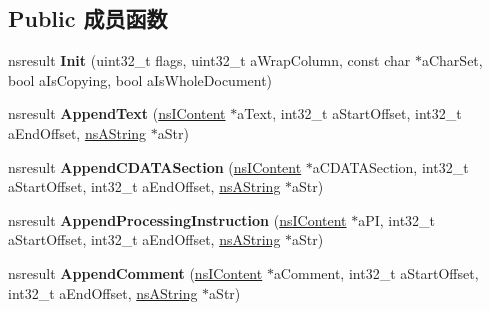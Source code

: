 \subsection*{Public 成员函数}
\begin{DoxyCompactItemize}
\item 
\mbox{\label{interfacens_i_content_serializer_a5e286e64920b179e0323b27c1aa722df}} 
nsresult {\bfseries Init} (uint32\+\_\+t flags, uint32\+\_\+t a\+Wrap\+Column, const char $\ast$a\+Char\+Set, bool a\+Is\+Copying, bool a\+Is\+Whole\+Document)
\item 
\mbox{\label{interfacens_i_content_serializer_a3f5c0d87ba91fc7f913ef51097fd716e}} 
nsresult {\bfseries Append\+Text} (\hyperlink{interfacens_i_content}{ns\+I\+Content} $\ast$a\+Text, int32\+\_\+t a\+Start\+Offset, int32\+\_\+t a\+End\+Offset, \hyperlink{structns_string_container}{ns\+A\+String} $\ast$a\+Str)
\item 
\mbox{\label{interfacens_i_content_serializer_a5493ced158faebbd97b8686a9c22a5ab}} 
nsresult {\bfseries Append\+C\+D\+A\+T\+A\+Section} (\hyperlink{interfacens_i_content}{ns\+I\+Content} $\ast$a\+C\+D\+A\+T\+A\+Section, int32\+\_\+t a\+Start\+Offset, int32\+\_\+t a\+End\+Offset, \hyperlink{structns_string_container}{ns\+A\+String} $\ast$a\+Str)
\item 
\mbox{\label{interfacens_i_content_serializer_a5ea38dc89d536f56f05a404d914a6595}} 
nsresult {\bfseries Append\+Processing\+Instruction} (\hyperlink{interfacens_i_content}{ns\+I\+Content} $\ast$a\+PI, int32\+\_\+t a\+Start\+Offset, int32\+\_\+t a\+End\+Offset, \hyperlink{structns_string_container}{ns\+A\+String} $\ast$a\+Str)
\item 
\mbox{\label{interfacens_i_content_serializer_aab51e3979381206078caa10d1c62b666}} 
nsresult {\bfseries Append\+Comment} (\hyperlink{interfacens_i_content}{ns\+I\+Content} $\ast$a\+Comment, int32\+\_\+t a\+Start\+Offset, int32\+\_\+t a\+End\+Offset, \hyperlink{structns_string_container}{ns\+A\+String} $\ast$a\+Str)
\item 
\mbox{\label{interfacens_i_content_serializer_a094be3469a5d21ed44b2a2b82a90fdaf}} 

\end{DoxyCompactItemize}
